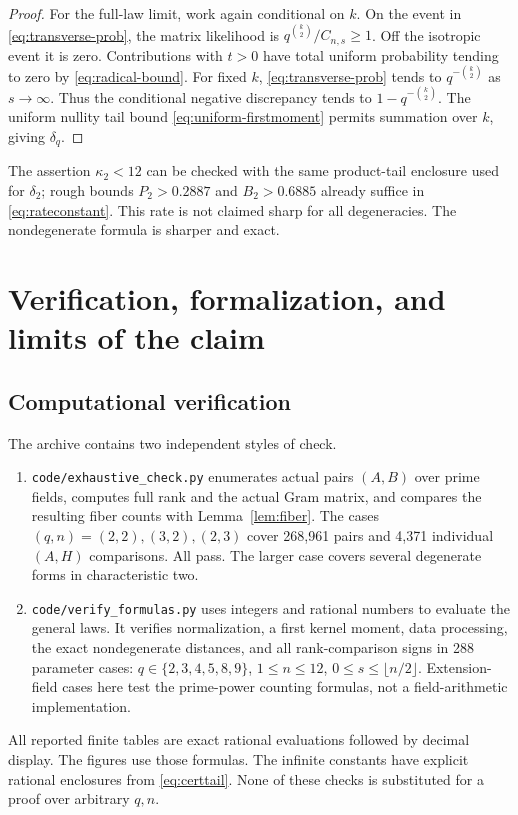 \documentclass[11pt]{article}
\newcommand{\1}{\mathbf 1}
\theoremstyle{definition}
\theoremstyle{remark}
\numberwithin{equation}{section}
\begin{document}
\begin{proof}
For the full-law limit, work again conditional on $k$. On the event in \eqref{eq:transverse-prob}, the matrix likelihood is $q^{\binom{k}{2}}/C_{n,s}\ge1$. Off the isotropic event it is zero. Contributions with $t>0$ have total uniform probability tending to zero by \eqref{eq:radical-bound}. For fixed $k$, \eqref{eq:transverse-prob} tends to $q^{-\binom{k}{2}}$ as $s\to\infty$. Thus the conditional negative discrepancy tends to $1-q^{-\binom{k}{2}}$. The uniform nullity tail bound \eqref{eq:uniform-firstmoment} permits summation over $k$, giving $\delta_q$.
\end{proof}

The assertion $\kappa_2<12$ can be checked with the same product-tail enclosure used for $\delta_2$; rough bounds $P_2>0.2887$ and $B_2>0.6885$ already suffice in \eqref{eq:rateconstant}. This rate is not claimed sharp for all degeneracies. The nondegenerate formula is sharper and exact.

\section{Verification, formalization, and limits of the claim}
\subsection{Computational verification}
The archive contains two independent styles of check.
\begin{enumerate}
\item \texttt{code/exhaustive\_check.py} enumerates actual pairs $(A,B)$ over prime fields, computes full rank and the actual Gram matrix, and compares the resulting fiber counts with Lemma~\ref{lem:fiber}. The cases $(q,n)=(2,2),(3,2),(2,3)$ cover 268,961 pairs and 4,371 individual $(A,H)$ comparisons. All pass. The larger case covers several degenerate forms in characteristic two.
\item \texttt{code/verify\_formulas.py} uses integers and rational numbers to evaluate the general laws. It verifies normalization, a first kernel moment, data processing, the exact nondegenerate distances, and all rank-comparison signs in 288 parameter cases: $q\in\{2,3,4,5,8,9\}$, $1\le n\le12$, $0\le s\le\lfloor n/2\rfloor$. Extension-field cases here test the prime-power counting formulas, not a field-arithmetic implementation.
\end{enumerate}
All reported finite tables are exact rational evaluations followed by decimal display. The figures use those formulas. The infinite constants have explicit rational enclosures from \eqref{eq:certtail}. None of these checks is substituted for a proof over arbitrary $q,n$.
\end{document}

